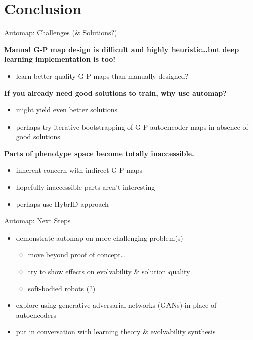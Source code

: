\section{Conclusion}

\begin{frame}{Automap: Challenges (\& Solutions?)}

\textbf{Manual G-P map design is difficult and highly heuristic\dots but deep
learning implementation is too!}
\pause
\vspace{-1ex}
\begin{itemize}[<+->]
\itemsep0em
\item learn better quality G-P maps than manually designed?
\end{itemize}
\vspace{-1ex}
\pause
\textbf{If you already need good solutions to train, why use automap?}
\pause
\vspace{-1ex}
\begin{itemize}[<+->]
\itemsep0em
\item might yield even better solutions
\item perhaps try iterative bootstrapping of G-P autoencoder maps in absence of good solutions
\end{itemize}
\vspace{-1ex}
\pause
\textbf{Parts of phenotype space become totally inaccessible.}
\pause
\vspace{-1ex}
\begin{itemize}[<+->]
\itemsep0em
\item inherent concern with indirect G-P maps \cite{clune2008generative}
\item hopefully inaccessible parts aren't interesting
\item perhaps use HybrID approach \cite{clune2009hybrid}
\end{itemize}

\end{frame}

\begin{frame}{Automap: Next Steps}

\begin{itemize}[<+->]
\item demonstrate automap on more challenging problem(s)
\begin{itemize}
\item move beyond proof of concept\dots
\item try to show effects on evolvability \& solution quality
\item soft-bodied robots (?)
\end{itemize}
\item explore using generative adversarial networks (GANs) in place of autoencoders
\item put in conversation with learning theory \& evolvability synthesis \cite{kouvaris2017evolution}
\end{itemize}

\end{frame}

